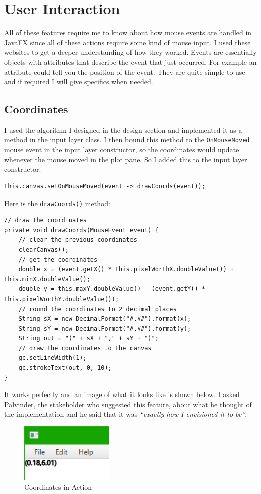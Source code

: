 \documentclass[../../../../main.tex]{subfiles}
\begin{document}
\section{User Interaction}
All of these features require me to know about how mouse events are handled in JavaFX since all of these actions require some kind of mouse input. I used these websites\cite{eventsJava} to get a deeper understanding of how they worked. Events are essentially objects with attributes that describe the event that just occurred. For example an attribute could tell you the position of the event. They are quite simple to use and if required I will give specifics when needed.

\subsection{Coordinates}
I used the algorithm I designed in the design section and implemented it as a method in the input layer class. I then bound this method to the \texttt{OnMouseMoved} mouse event in the input layer constructor, so the coordinates would update whenever the mouse moved in the plot pane. So I added this to the input layer constructor:
\begin{verbatim}
this.canvas.setOnMouseMoved(event -> drawCoords(event));
\end{verbatim}
Here is the \texttt{drawCoords()} method:
\begin{verbatim}
// draw the coordinates
private void drawCoords(MouseEvent event) {
	// clear the previous coordinates
	clearCanvas();
	// get the coordinates
	double x = (event.getX() * this.pixelWorthX.doubleValue()) + this.minX.doubleValue();
	double y = this.maxY.doubleValue() - (event.getY() * this.pixelWorthY.doubleValue());
	// round the coordinates to 2 decimal places
	String sX = new DecimalFormat("#.##").format(x);
	String sY = new DecimalFormat("#.##").format(y);
	String out = "(" + sX + "," + sY + ")";
	// draw the coordinates to the canvas
	gc.setLineWidth(1);
	gc.strokeText(out, 0, 10);
}
\end{verbatim}
It works perfectly and an image of what it looks like is shown below. I asked Palvinder, the stakeholder who suggested this feature, about what he thought of the implementation and he said that it was \textit{``exactly how I envisioned it to be''}.
\begin{figure}[H]
	\centering
	\includegraphics[width=0.4\textwidth]{images/coords}
	\caption{Coordinates in Action}
\end{figure}
\newpage
\end{document}
